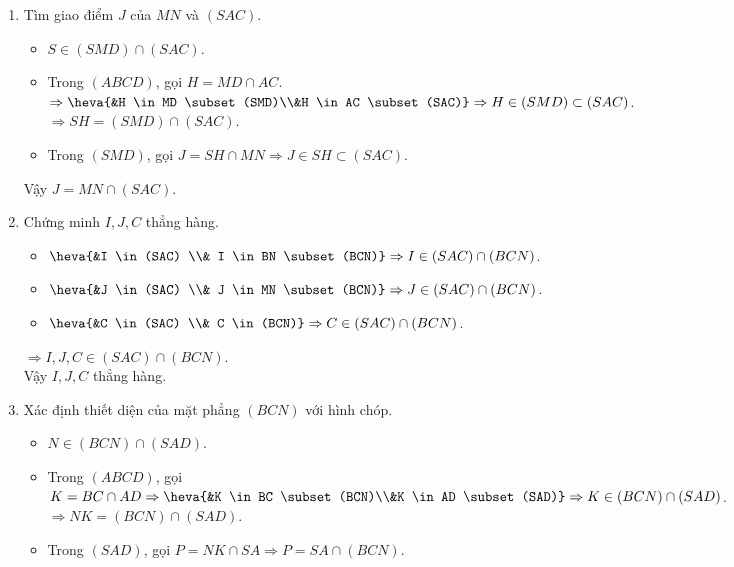 \begin{bt}
\begin{bt}
{\begin{enumerate}
\begin{itemize}
				$\Rightarrow SO=(SAC) \cap (SBD)$.\\
				\item Trong $(SBD)$, gọi $I=BN \cap SO \Rightarrow I \in SO \subset (SAC)$.
			\end{itemize}
			Vậy $I=	BN \cap (SAC)$.
			\item Tìm giao điểm $J$ của $MN$ và $(SAC)$.
			\begin{itemize}
				\item $ S \in (SMD) \cap (SAC)$.
				\item  Trong $(ABCD)$, gọi $H=MD \cap AC$.\\
				$ \Rightarrow \heva{&H \in MD \subset (SMD)\\&H \in AC \subset (SAC)}\Rightarrow H \in (SMD) \subset (SAC)$.\\
				$\Rightarrow SH = (SMD) \cap (SAC)$.
				\item  Trong $(SMD)$, gọi $J = SH \cap MN \Rightarrow J \in SH \subset (SAC)$.
			\end{itemize}
			Vậy $J =MN \cap (SAC)$. 
			\item Chứng minh $I, J, C$ thẳng hàng.
			\begin{itemize}
				\item $\heva{&I \in (SAC) \\& I \in BN \subset (BCN)} \Rightarrow I \in (SAC) \cap (BCN)$.
				\item $\heva{&J \in (SAC) \\& J \in MN \subset (BCN)} \Rightarrow J \in (SAC) \cap (BCN)$.
				\item $\heva{&C \in (SAC) \\& C \in  (BCN)} \Rightarrow C \in (SAC) \cap (BCN)$.
			\end{itemize}
			$\Rightarrow I, J, C \in (SAC) \cap (BCN)$.\\
			Vậy $I, J, C$ thẳng hàng.
			\item Xác định thiết diện của mặt phẳng $(BCN)$ với hình chóp.
			\begin{itemize}
				\item $N \in (BCN) \cap (SAD)$.
				\item  Trong $(ABCD)$, gọi $K = BC \cap AD \Rightarrow \heva{&K \in BC \subset (BCN)\\&K \in AD \subset (SAD)} \Rightarrow K \in (BCN) \cap (SAD)$.\\
				$\Rightarrow NK =(BCN) \cap (SAD)$.
				\item Trong $(SAD)$, gọi $P =NK \cap SA \Rightarrow P = SA \cap (BCN)$.
			\end{itemize}

\end{enumerate}}
\end{bt}
\end{bt}
